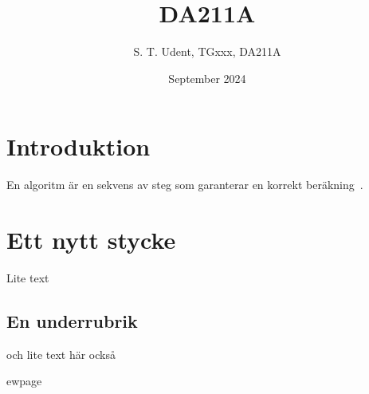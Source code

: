 \documentclass[12pt,twoside,a4paper]{article} %
\title{DA211A}
\author{S. T. Udent, TGxxx, DA211A}
\date{September 2024} %
\begin{document}

\maketitle %




\section{Introduktion}
En algoritm är en sekvens av steg som garanterar en korrekt beräkning~\cite{kernighan2021}. %

\section{Ett nytt stycke}
Lite text
\subsection{En underrubrik}
och lite text här också

%
ewpage %


\end{document}
